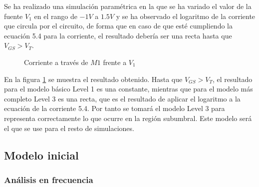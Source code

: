 Se ha realizado una simulación paramétrica en la que se ha variado el valor de la fuente $V_1$ en el rango de $-1 V$ a $1.5 V$ y se ha observado el logaritmo de la corriente que circula por el circuito, de forma que en caso de que esté cumpliendo la ecuación 5.4 para la corriente, el resultado debería ser una recta hasta que $V_{GS}>V_T$. 

	\begin{figure}[h!]
		\centering
		\caption{Corriente a través de $M1$ frente a $V_1$}	\label{Polariz_sim}
	\end{figure}
	
	En la figura \ref{Polariz_sim} se muestra el resultado obtenido. Hasta que $V_{GS}>V_T$, el resultado para el modelo básico Level 1 es una constante, mientras que para el modelo más completo Level 3 es una recta, que es el resultado de aplicar el logaritmo a la ecuación de la corriente 5.4. Por tanto se tomará el modelo Level 3 para representa correctamente lo que ocurre en la región subumbral. Este modelo será el que se use para el resto de simulaciones.
	
	\subsection{Modelo inicial}
	
	\subsubsection{Análisis en frecuencia}
	
